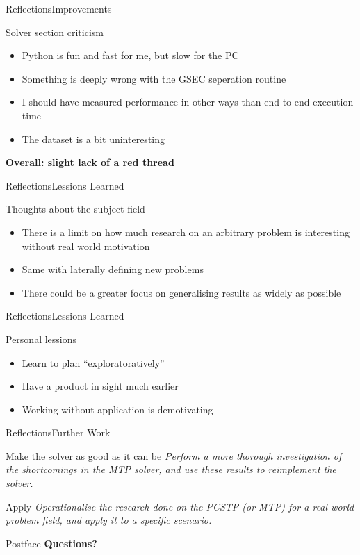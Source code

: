 \documentclass[rgb,dvipsnames]{beamer}
\begin{document}
\begin{frame}{Reflections}{Improvements}
  \begin{block}{Solver section criticism}
    \begin{itemize}[<+->]
    \item Python is fun and fast for me, but slow for the PC
    \item Something is deeply wrong with the GSEC seperation routine
    \item I should have measured performance in other ways than end to end execution time
    \item The dataset is a bit uninteresting
    \end{itemize}
  \end{block}\pause
  \textbf{Overall: slight lack of a red thread}
\end{frame}


\begin{frame}{Reflections}{Lessions Learned}
  \begin{block}{Thoughts about the subject field}
    \begin{itemize}[<+->]
    \item There is a limit on how much research on an arbitrary problem is interesting
      without real world motivation
    \item Same with laterally defining new problems
    \item There could be a greater focus on generalising
      results as widely as possible
    \end{itemize}
  \end{block}
\end{frame}

\begin{frame}{Reflections}{Lessions Learned}
  \begin{block}{Personal lessions}
    \begin{itemize}[<+->]
    \item Learn to plan ``exploratoratively''
    \item Have a product in sight much earlier
    \item Working without application is demotivating 
    \end{itemize}
  \end{block}
\end{frame}

\begin{frame}{Reflections}{Further Work}
  \begin{block}{Make the solver as good as it can be}
    \textit{Perform a more thorough investigation of the shortcomings in the MTP
    solver, and use these results to reimplement the solver.}
  \end{block}

  \begin{block}{Apply}
    \textit{Operationalise the research done on the PCSTP (or MTP) for a real-world
    problem field, and apply it to a specific scenario.}
  \end{block}
\end{frame}

\begin{frame}{Postface}
  \pause
  \large\textbf{Questions?}
\end{frame}
\end{document}
